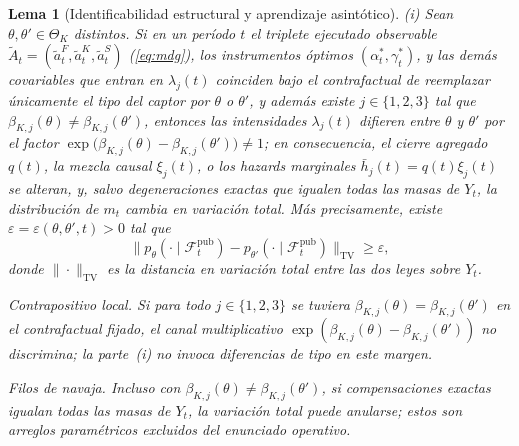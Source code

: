 \documentclass[review,authoryear,12pt]{elsarticle}
\theoremstyle{plain}
\newtheorem{lemma}[theorem]{Lema}
\theoremstyle{definition}
\newcommand{\ThetaK}{\Theta_K}
\newcommand{\1}{\mathbf{1}}
\begin{document}
\begin{lemma}[Identificabilidad estructural y aprendizaje asintótico]
\medskip
\noindent\textup{(i)}
Sean $\theta,\theta'\in\ThetaK$ distintos. Si en un período $t$ el triplete ejecutado observable $\tilde{A}_t=(\tilde{a}_t^F,\tilde{a}_t^K,\tilde{a}_t^S)$ \textup{(}\eqref{eq:mdg}\textup{)}, los instrumentos óptimos $(\alpha_t^\ast,\gamma_t^\ast)$, y las demás covariables que entran en $\lambda_j(t)$ coinciden bajo el contrafactual de reemplazar únicamente el tipo del captor por $\theta$ o $\theta'$, y además existe $j\in\{1,2,3\}$ tal que $\beta_{K,j}(\theta)\neq \beta_{K,j}(\theta')$, entonces las intensidades $\lambda_j(t)$ difieren entre $\theta$ y $\theta'$ por el factor $\exp\bigl(\beta_{K,j}(\theta)-\beta_{K,j}(\theta')\bigr)\neq 1$; en consecuencia, el cierre agregado $q(t)$, la mezcla causal $\xi_j(t)$, o los hazards marginales $\bar h_j(t)=q(t)\xi_j(t)$ se alteran, y, salvo degeneraciones exactas que igualen todas las masas de $Y_t$, la distribución de $m_t$ cambia en variación total. Más precisamente, existe $\varepsilon=\varepsilon(\theta,\theta',t)>0$ tal que
\begin{equation}
\label{eq:TV-separation}
\bigl\| p_\theta(\cdot\mid \mathcal{F}_t^{\mathrm{pub}})-p_{\theta'}(\cdot\mid \mathcal{F}_t^{\mathrm{pub}})\bigr\|_{\mathrm{TV}}\ge \varepsilon,
\end{equation}
donde $\|\cdot\|_{\mathrm{TV}}$ es la distancia en variación total entre las dos leyes sobre $Y_t$.
\begin{list}{}{%
  \setlength{\leftmargin}{2.25em}%
  \setlength{\labelwidth}{2.25em}%
  \setlength{\labelsep}{0.45em}%
  \setlength{\itemsep}{0.35em}%
  \setlength{\parsep}{0pt}%
  \setlength{\topsep}{0.25em}%
}
\item[\textup{(C1)}] \textup{Contrapositivo local.}\quad
Si para todo $j\in\{1,2,3\}$ se tuviera $\beta_{K,j}(\theta)=\beta_{K,j}(\theta')$ en el contrafactual fijado, el canal multiplicativo $\exp(\beta_{K,j}(\theta)-\beta_{K,j}(\theta'))$ no discrimina; la parte~\textup{(i)} no invoca diferencias de tipo en este margen.
\item[\textup{(C2)}] \textup{Filos de navaja.}\quad
Incluso con $\beta_{K,j}(\theta)\neq\beta_{K,j}(\theta')$, si compensaciones exactas igualan todas las masas de $Y_t$, la variación total puede anularse; estos son arreglos paramétricos excluidos del enunciado operativo.
\end{list}


\end{lemma}
\end{document}
